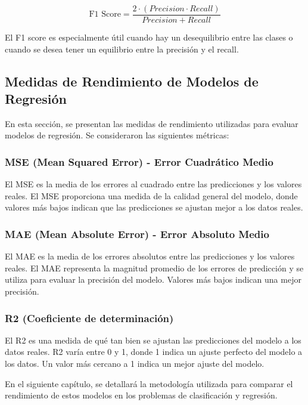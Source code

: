 \begin{equation}
\text{F1 Score} = \frac{2 \cdot (Precision \cdot Recall)}{Precision + Recall}
\end{equation}

El F1 score es especialmente útil cuando hay un desequilibrio entre las clases o cuando se desea tener un equilibrio entre la precisión y el recall.

\subsection{Medidas de Rendimiento de Modelos de Regresión}

En esta sección, se presentan las medidas de rendimiento utilizadas para evaluar modelos de regresión. Se consideraron las siguientes métricas:

\subsubsection{MSE (Mean Squared Error) - Error Cuadrático Medio}
El MSE es la media de los errores al cuadrado entre las predicciones y los valores reales. El MSE proporciona una medida de la calidad general del modelo, donde valores más bajos indican que las predicciones se ajustan mejor a los datos reales.

\subsubsection{MAE (Mean Absolute Error) - Error Absoluto Medio}
El MAE es la media de los errores absolutos entre las predicciones y los valores reales. El MAE representa la magnitud promedio de los errores de predicción y se utiliza para evaluar la precisión del modelo. Valores más bajos indican una mejor precisión.

\subsubsection{R2 (Coeficiente de determinación)}
El R2 es una medida de qué tan bien se ajustan las predicciones del modelo a los datos reales. R2 varía entre 0 y 1, donde 1 indica un ajuste perfecto del modelo a los datos. Un valor más cercano a 1 indica un mejor ajuste del modelo.

En el siguiente capítulo, se detallará la metodología utilizada para comparar el rendimiento de estos modelos en los problemas de clasificación y regresión.

